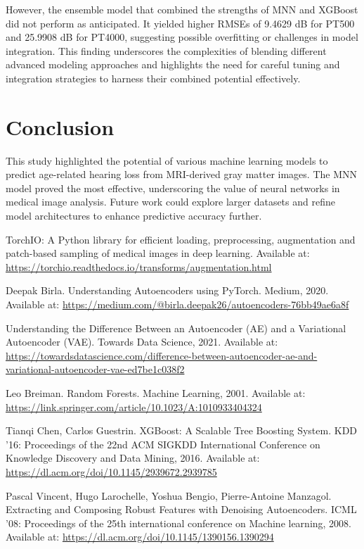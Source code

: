 \documentclass[conference,compsoc]{IEEEtran}
\begin{document}
\vspace{\baselineskip} %

However, the ensemble model that combined the strengths of MNN and XGBoost did not perform as anticipated. It yielded higher RMSEs of 9.4629 dB for PT500 and 25.9908 dB for PT4000, suggesting possible overfitting or challenges in model integration. This finding underscores the complexities of blending different advanced modeling approaches and highlights the need for careful tuning and integration strategies to harness their combined potential effectively.



\section{Conclusion}

This study highlighted the potential of various machine learning models to predict age-related hearing loss from MRI-derived gray matter images. The MNN model proved the most effective, underscoring the value of neural networks in medical image analysis. Future work could explore larger datasets and refine model architectures to enhance predictive accuracy further.\\

\begin{thebibliography}{1}

TorchIO: A Python library for efficient loading, preprocessing, augmentation and patch-based sampling of medical images in deep learning.
\newblock Available at: \url{https://torchio.readthedocs.io/transforms/augmentation.html}

Deepak Birla.
\newblock Understanding Autoencoders using PyTorch.
\newblock Medium, 2020.
\newblock Available at: \url{https://medium.com/@birla.deepak26/autoencoders-76bb49ae6a8f}

Understanding the Difference Between an Autoencoder (AE) and a Variational Autoencoder (VAE).
\newblock Towards Data Science, 2021.
\newblock Available at: \url{https://towardsdatascience.com/difference-between-autoencoder-ae-and-variational-autoencoder-vae-ed7be1c038f2}

Leo Breiman.
\newblock Random Forests.
\newblock Machine Learning, 2001.
\newblock Available at: \url{https://link.springer.com/article/10.1023/A:1010933404324}

Tianqi Chen, Carlos Guestrin.
\newblock XGBoost: A Scalable Tree Boosting System.
\newblock KDD '16: Proceedings of the 22nd ACM SIGKDD International Conference on Knowledge Discovery and Data Mining, 2016.
\newblock Available at: \url{https://dl.acm.org/doi/10.1145/2939672.2939785}

Pascal Vincent, Hugo Larochelle, Yoshua Bengio, Pierre-Antoine Manzagol.
\newblock Extracting and Composing Robust Features with Denoising Autoencoders.
\newblock ICML '08: Proceedings of the 25th international conference on Machine learning, 2008.
\newblock Available at: \url{https://dl.acm.org/doi/10.1145/1390156.1390294}

\end{thebibliography}
\end{document}
